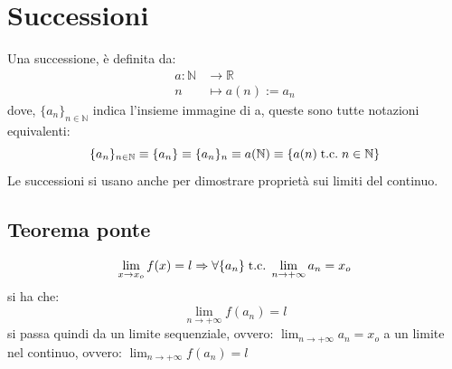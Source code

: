 \documentclass[a4paper, 12pt, openany]{book}
\begin{document}
	 \chapter{Successioni}
	 Una successione, è definita da:
	 \[\begin{aligned}
	 	a : \mathbb{N} & \rightarrow \mathbb{R} \\
	 	n & \mapsto a(n) := a_n
	 \end{aligned}\]
	 dove, $\{a_n\}_{n \in \mathbb{N}}$ indica l'insieme immagine di a, queste sono tutte notazioni equivalenti:
	 \[\{a_n\}_{n \in \mathbb{N}} \equiv \{a_n\} \equiv \{a_n\}_n \equiv a(\mathbb{N}) \equiv \{a(n) \;\text{t.c.}\; n \in \mathbb{N}\}\]
	 Le successioni si usano anche per dimostrare proprietà sui limiti del continuo.
	 
	 \section{Teorema ponte}
	 \[\lim_{x\rightarrow x_o} f(x) = l \Rightarrow \forall \{a_n\} \;\text{t.c.}\; \lim_{n \rightarrow +\infty} a_n = x_o\]
	 si ha che:
	 \[\lim_{n \rightarrow +\infty} f(a_n) = l\]
	 si passa quindi da un limite sequenziale, ovvero: $\lim_{n \rightarrow +\infty} a_n = x_o$ a un limite nel continuo, ovvero: $\lim_{n \rightarrow +\infty} f(a_n) = l$
\end{document}

